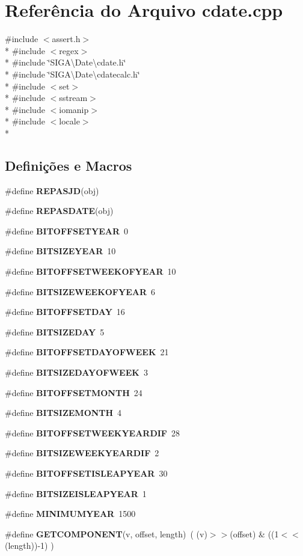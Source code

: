 \section{Referência do Arquivo cdate.\+cpp}
\label{cdate_8cpp}
{\ttfamily \#include $<$assert.\+h$>$}\\*
{\ttfamily \#include $<$regex$>$}\\*
{\ttfamily \#include \char`\"{}S\+I\+G\+A\textbackslash{}\+Date\textbackslash{}cdate.\+h\char`\"{}}\\*
{\ttfamily \#include \char`\"{}S\+I\+G\+A\textbackslash{}\+Date\textbackslash{}cdatecalc.\+h\char`\"{}}\\*
{\ttfamily \#include $<$set$>$}\\*
{\ttfamily \#include $<$sstream$>$}\\*
{\ttfamily \#include $<$iomanip$>$}\\*
{\ttfamily \#include $<$locale$>$}\\*
\subsection*{Definições e Macros}
\begin{DoxyCompactItemize}
\item 
\#define {\bf R\+E\+P\+A\+S\+JD}(obj)
\item 
\#define {\bf R\+E\+P\+A\+S\+D\+A\+TE}(obj)
\item 
\#define {\bf B\+I\+T\+O\+F\+F\+S\+E\+T\+Y\+E\+AR}~0
\item 
\#define {\bf B\+I\+T\+S\+I\+Z\+E\+Y\+E\+AR}~10
\item 
\#define {\bf B\+I\+T\+O\+F\+F\+S\+E\+T\+W\+E\+E\+K\+O\+F\+Y\+E\+AR}~10
\item 
\#define {\bf B\+I\+T\+S\+I\+Z\+E\+W\+E\+E\+K\+O\+F\+Y\+E\+AR}~6
\item 
\#define {\bf B\+I\+T\+O\+F\+F\+S\+E\+T\+D\+AY}~16
\item 
\#define {\bf B\+I\+T\+S\+I\+Z\+E\+D\+AY}~5
\item 
\#define {\bf B\+I\+T\+O\+F\+F\+S\+E\+T\+D\+A\+Y\+O\+F\+W\+E\+EK}~21
\item 
\#define {\bf B\+I\+T\+S\+I\+Z\+E\+D\+A\+Y\+O\+F\+W\+E\+EK}~3
\item 
\#define {\bf B\+I\+T\+O\+F\+F\+S\+E\+T\+M\+O\+N\+TH}~24
\item 
\#define {\bf B\+I\+T\+S\+I\+Z\+E\+M\+O\+N\+TH}~4
\item 
\#define {\bf B\+I\+T\+O\+F\+F\+S\+E\+T\+W\+E\+E\+K\+Y\+E\+A\+R\+D\+IF}~28
\item 
\#define {\bf B\+I\+T\+S\+I\+Z\+E\+W\+E\+E\+K\+Y\+E\+A\+R\+D\+IF}~2
\item 
\#define {\bf B\+I\+T\+O\+F\+F\+S\+E\+T\+I\+S\+L\+E\+A\+P\+Y\+E\+AR}~30
\item 
\#define {\bf B\+I\+T\+S\+I\+Z\+E\+I\+S\+L\+E\+A\+P\+Y\+E\+AR}~1
\item 
\#define {\bf M\+I\+N\+I\+M\+U\+M\+Y\+E\+AR}~1500
\item 
\#define {\bf G\+E\+T\+C\+O\+M\+P\+O\+N\+E\+NT}(v,  offset,  length)~( (v)$>$$>$(offset) \& ((1$<$$<$(length))-\/1) )
\end{DoxyCompactItemize}

